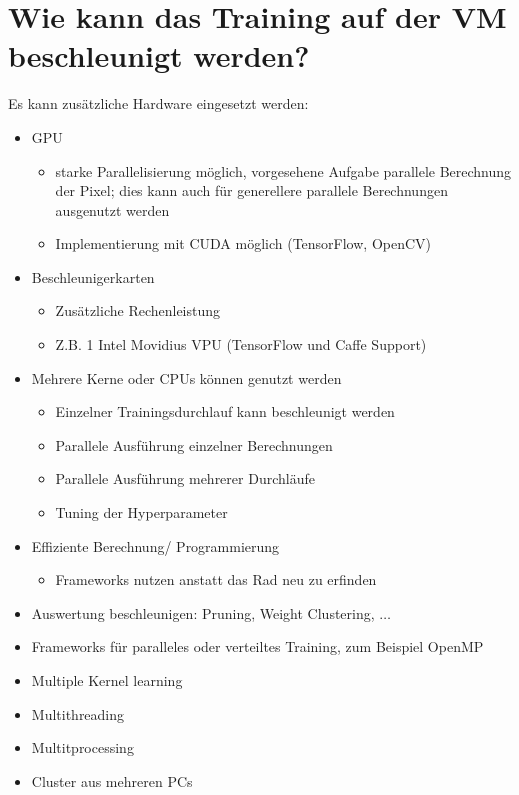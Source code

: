 %
%
%


\chapter{Wie kann das Training auf der VM beschleunigt werden?}

Es kann zusätzliche Hardware eingesetzt werden:

\begin{itemize}
  \item GPU 
    \begin{itemize}
      \item starke Parallelisierung möglich, vorgesehene Aufgabe parallele Berechnung der Pixel; dies kann auch für generellere parallele Berechnungen ausgenutzt werden 
	  \item Implementierung mit CUDA möglich (TensorFlow, OpenCV)
     \end{itemize}
  \item Beschleunigerkarten
    \begin{itemize}
	  \item Zusätzliche Rechenleistung
	  \item Z.B. 1 Intel\textsuperscript{\textregistered}  Movidius\textsuperscript{\texttrademark} VPU (TensorFlow und Caffe Support)
    \end{itemize}
\end{itemize}


\begin{itemize}
  \item Mehrere Kerne oder CPUs können genutzt werden
    \begin{itemize}
	  \item Einzelner Trainingsdurchlauf kann beschleunigt werden 
	  \item Parallele Ausführung einzelner Berechnungen
	  \item Parallele Ausführung mehrerer Durchläufe
	  \item Tuning der Hyperparameter
    \end{itemize}	
  \item Effiziente Berechnung/ Programmierung
    \begin{itemize}
     \item Frameworks nutzen anstatt \glqq das Rad neu zu erfinden\grqq
    \end{itemize}
  \item Auswertung beschleunigen: Pruning, Weight Clustering, $\ldots$
  \item Frameworks für paralleles oder verteiltes Training, zum Beispiel OpenMP
  \item Multiple Kernel learning
  \item Multithreading
  \item Multitprocessing
  \item Cluster aus mehreren PCs
\end{itemize}

